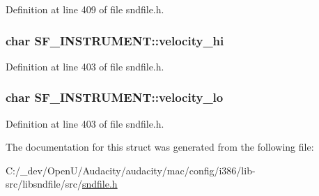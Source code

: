 Definition at line 409 of file sndfile.\+h.

\subsubsection[{\texorpdfstring{velocity\+\_\+hi}{velocity_hi}}]{\setlength{\rightskip}{0pt plus 5cm}char S\+F\+\_\+\+I\+N\+S\+T\+R\+U\+M\+E\+N\+T\+::velocity\+\_\+hi}\hypertarget{struct_s_f___i_n_s_t_r_u_m_e_n_t_a4e1435a98a085a8df95f10ff1bed536f}{}\label{struct_s_f___i_n_s_t_r_u_m_e_n_t_a4e1435a98a085a8df95f10ff1bed536f}


Definition at line 403 of file sndfile.\+h.

\subsubsection[{\texorpdfstring{velocity\+\_\+lo}{velocity_lo}}]{\setlength{\rightskip}{0pt plus 5cm}char S\+F\+\_\+\+I\+N\+S\+T\+R\+U\+M\+E\+N\+T\+::velocity\+\_\+lo}\hypertarget{struct_s_f___i_n_s_t_r_u_m_e_n_t_a3637643126becba84608741033f91f47}{}\label{struct_s_f___i_n_s_t_r_u_m_e_n_t_a3637643126becba84608741033f91f47}


Definition at line 403 of file sndfile.\+h.



The documentation for this struct was generated from the following file\+:\begin{DoxyCompactItemize}
\item 
C\+:/\+\_\+dev/\+Open\+U/\+Audacity/audacity/mac/config/i386/lib-\/src/libsndfile/src/\hyperlink{mac_2config_2i386_2lib-src_2libsndfile_2src_2sndfile_8h}{sndfile.\+h}\end{DoxyCompactItemize}
